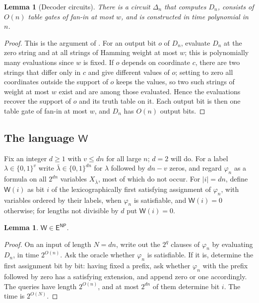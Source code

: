 \documentclass[11pt,reqno]{amsart}
\numberwithin{equation}{section}
\theoremstyle{plain}
\newtheorem{lemma}[theorem]{Lemma}
\theoremstyle{definition}
\theoremstyle{remark}
\newcommand{\ENP}{\mathsf{E}^{\mathsf{NP}}}
\newcommand{\Wl}{\mathsf{W}}
\begin{document}
\begin{lemma}[Decoder circuits]\label{lem:decoder}
There is a circuit $\Delta_n$ that computes $D_n$, consists of $O(n)$ table
gates of fan-in at most $w$, and is constructed in time polynomial in $n$.
\end{lemma}

\begin{proof}
This is the argument of \cite[Appendix C.1]{OAI26}. For an output bit $o$ of
$D_n$, evaluate $D_n$ at the zero string and at all strings of Hamming weight
at most $w$; this is polynomially many evaluations since $w$ is fixed. If $o$
depends on coordinate $c$, there are two strings that differ only in $c$ and
give different values of $o$; setting to zero all coordinates outside the
support of $o$ keeps the values, so two such strings of weight at most $w$
exist and are among those evaluated. Hence the evaluations recover the support
of $o$ and its truth table on it. Each output bit is then one table gate of
fan-in at most $w$, and $D_n$ has $O(n)$ output bits.
\end{proof}

\subsection{The language $\Wl$}
Fix an integer $d\ge1$ with $v\le dn$ for all large $n$; $d=2$ will do. For a
label $\lambda\in\{0,1\}^v$ write $\bar\lambda\in\{0,1\}^{dn}$ for $\lambda$
followed by $dn-v$ zeros, and regard $\varphi_n$ as a formula on all $2^{dn}$
variables $X_{\bar\lambda}$, most of which do not occur. For $|i|=dn$, define
$\Wl(i)$ as bit $i$ of the lexicographically first satisfying assignment of
$\varphi_n$, with variables ordered by their labels, when $\varphi_n$ is
satisfiable, and $\Wl(i)=0$ otherwise; for lengths not divisible by $d$ put
$\Wl(i)=0$.

\begin{lemma}\label{lem:WinENP}
$\Wl\in\ENP$.
\end{lemma}

\begin{proof}
On an input of length $N=dn$, write out the $2^q$ clauses of $\varphi_n$ by
evaluating $D_n$, in time $2^{O(n)}$. Ask the oracle whether $\varphi_n$ is
satisfiable. If it is, determine the first assignment bit by bit: having fixed
a prefix, ask whether $\varphi_n$ with the prefix followed by zero has a
satisfying extension, and append zero or one accordingly. The queries have
length $2^{O(n)}$, and at most $2^{dn}$ of them determine bit $i$. The time is
$2^{O(N)}$.
\end{proof}
\end{document}
